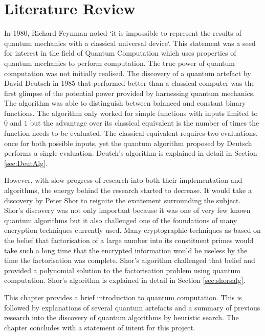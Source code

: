 \chapter{Literature Review}
\label{sec:introtoquantcomp}
In 1980, Richard Feynman noted `it is impossible to represent the results of quantum mechanics with a classical universal device`\cite{Feynman82simulatingphysics}.
This statement was a seed for interest in the field of Quantum Computation which uses properties of quantum mechanics to perform computation.
The true power of quantum computation was not initially realised.
The discovery of a quantum artefact by David Deutsch\cite{Deutsch85quantumtheory} in 1985 that performed better than a classical computer was the first glimpse of the potential power provided by harnessing quantum mechanics.
The algorithm was able to distinguish between balanced and constant binary functions.
The algorithm only worked for simple functions with inputs limited to $0$ and $1$ but the advantage over its classical equivalent is the number of times the function needs to be evaluated.
The classical equivalent requires two evaluations, once for both possible inputs, yet the quantum algorithm proposed by Deutsch performs a single evaluation.
Deutch's algorithm is explained in detail in Section \ref{sec:DeutAlg}.

However, with slow progress of research into both their implementation and algorithms, the energy behind the research started to decrease.
It would take a discovery by Peter Shor\cite{Shor:1994jg} to reignite the excitement surrounding the subject.
Shor's discovery was not only important because it was one of very few known quantum algorithms but it also challenged one of the foundations of many encryption techniques currently used.
Many cryptographic techniques as based on the belief that factorisation of a large number into its constituent primes would take such a long time that the encrypted information would be useless by the time the factorisation was complete.
Shor's algorithm challenged that belief and provided a polynomial solution to the factorisation problem using quantum computation.
Shor's algorithm is explained in detail in Section \ref{sec:shorsalg}.

This chapter provides a brief introduction to quantum computation.
This is followed by explanations of several quantum artefacts and a summary of previous research into the discovery of quantum algorithms by heuristic search.
The chapter concludes with a statement of intent for this project.

